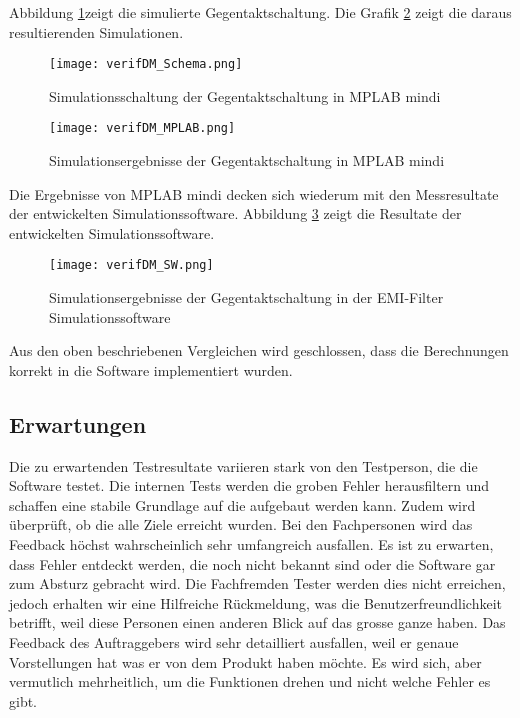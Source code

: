 \newpage
Abbildung \ref{fig:verifDM_Schema}zeigt die simulierte Gegentaktschaltung. Die Grafik \ref{fig:verifDM_MPLAB} zeigt die daraus resultierenden Simulationen.
\begin{figure}[H]
	\centering
	\texttt{[image: verifDM\_Schema.png]}
	\caption{Simulationsschaltung der Gegentaktschaltung in MPLAB mindi}
	\label{fig:verifDM_Schema}
\end{figure}
\newpage
\begin{figure}[H]
	\centering
	\texttt{[image: verifDM\_MPLAB.png]}
 	\caption{Simulationsergebnisse der Gegentaktschaltung in MPLAB mindi}
	\label{fig:verifDM_MPLAB}
\end{figure}
Die Ergebnisse von MPLAB mindi decken sich wiederum mit den Messresultate der entwickelten Simulationssoftware. Abbildung \ref{fig:verifDM_SW} zeigt die Resultate der entwickelten Simulationssoftware.
\begin{figure}[H]
	\centering
	\texttt{[image: verifDM\_SW.png]}
	\caption{Simulationsergebnisse der Gegentaktschaltung in der EMI-Filter Simulationssoftware}
	\label{fig:verifDM_SW}
\end{figure}
Aus den oben beschriebenen Vergleichen wird geschlossen, dass die Berechnungen korrekt in die Software implementiert wurden.
\newpage

\subsection{Erwartungen} \label{subsec:validierung}
Die zu erwartenden Testresultate variieren stark von den Testperson, die die Software testet.
Die internen Tests werden die groben Fehler herausfiltern und schaffen eine stabile Grundlage auf die aufgebaut werden kann. Zudem wird überprüft, ob die alle Ziele erreicht wurden.
Bei den Fachpersonen wird das Feedback höchst wahrscheinlich sehr umfangreich   ausfallen. Es ist zu erwarten, dass Fehler entdeckt werden, die noch nicht bekannt sind oder die Software gar zum Absturz gebracht wird. 
Die Fachfremden Tester werden dies nicht erreichen, jedoch erhalten wir eine Hilfreiche Rückmeldung, was die Benutzerfreundlichkeit betrifft, weil diese Personen einen anderen Blick auf das grosse ganze haben. 
Das Feedback des Auftraggebers wird sehr detailliert ausfallen, weil er genaue Vorstellungen hat was er von dem Produkt haben möchte. Es wird sich, aber vermutlich mehrheitlich, um die Funktionen drehen und nicht welche Fehler es gibt. 





